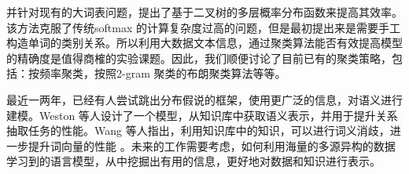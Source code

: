 \documentclass[12pt,a4paper]{article}
\begin{document}
并针对现有的大词表问题，提出了基于二叉树的多层概率分布函数来提高其效率。该方法克服了传统softmax 的计算复杂度过高的问题，但是最初提出来是需要手工构造单词的类别关系。所以利用大数据文本信息，通过聚类算法能否有效提高模型的精确度是值得商榷的实验课题。因此，我们顺便讨论了目前已有的聚类策略，包括：按频率聚类，按照2-gram 聚类的布朗聚类算法等等。


最近一两年，已经有人尝试跳出分布假说的框架，使用更广泛的信息，对语义进行建模。Weston 等人设计了一个模型，从知识库中获取语义表示，并用于提升关系抽取任务的性能\cite{DBLP:conf/emnlp/WestonBYU13}。Wang 等人指出，利用知识库中的知识，可以进行词义消歧，进一步提升词向量的性能 \cite{DBLP:conf/emnlp/2014}。未来的工作需要考虑，如何利用海量的多源异构的数据学习到的语言模型，从中挖掘出有用的信息，更好地对数据和知识进行表示。
\newpage
{}

\end{document}
